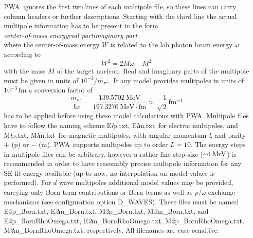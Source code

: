 \documentclass[a4paper,10pt]{article}
\def\PWA{\ttfamily PWA\rmfamily\ }
\def\bl{\phantom{0}}
\def\tt{\ttfamily}
\def\rm{\rmfamily}
\begin{document}
\PWA ignores the first two lines of each multipole file, so these lines can carry column headers or further descriptions.
Starting with the third line the actual multipole information has to be present in the form\\
\tt\textit{center-of-mass energy\bl\bl\bl\bl real part\bl\bl\bl\bl imaginary part}\rm\\
where the center-of-mass energy $W$ is related to the lab photon beam energy $\omega$ according to
\begin{displaymath}
 W^2 = 2M\omega + M^2
\end{displaymath}
with the mass $M$ of the target nucleon. Real and imaginary parts of the multipole must be given in units of
$10^{-3}/m_{\pi^+}$. If any model provides multipoles in units of $10^{-3}\:\mathrm{fm}$ a conversion factor of
\begin{displaymath}
 \frac{m_{\pi^+}}{\hbar c} =\frac{139.5702\:\mathrm{MeV}}{197.3270\:\mathrm{MeV\cdot fm}}
\approx \sqrt\frac{1}{2}\:\mathrm{fm^{-1}}
\end{displaymath}
has to be applied before using these model calculations with \tt PWA\rm.
Multipole files have to follow the naming scheme
\tt E\textit{l}p.txt\rm,
\tt E\textit{l}m.txt\rm\ 
for electric multipoles, and
\tt M\textit{l}p.txt\rm,
\tt M\textit{l}m.txt\rm\ 
for magnetic multipoles, with angular momentum \tt\textit{l}\rm, and parity 
$+$ (\tt p\rm) or $-$ (\tt m\rm).
\PWA supports multipoles up to order $L = 10$.
The energy steps in multipole files can be arbitrary, however a rather fine step size ($\sim\hspace{-0.4em}1\:\mathrm{MeV}$)
is recommended in order to have reasonably precise multipole information for any SE fit energy available
(up to now, no interpolation on model values is performed).
For $d$ wave multipoles additional model values may be provided, carrying only Born term contributions or Bern terms as well as 
$\rho/\omega$ exchange mechanisms (see configuration option \tt D\_WAVES\rm).
These files must be named
\tt E\textit{2}p\_Born.txt\rm,
\tt E\textit{2}m\_Born.txt\rm,
\tt M\textit{2}p\_Born.txt\rm,
\tt M\textit{2}m\_Born.txt\rm,
and
\tt E\textit{2}p\_BornRhoOmega.txt\rm,
\tt E\textit{2}m\_BornRhoOmega.txt\rm,
\tt M\textit{2}p\_BornRhoOmega.txt\rm,
\tt M\textit{2}m\_BornRhoOmega.txt\rm,
respectively.
All filenames are case-sensitive.
\end{document}
